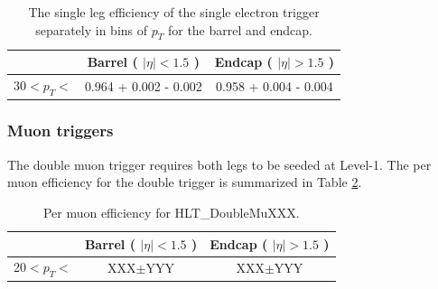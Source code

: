 \begin{table}[!ht]
\begin{center}
\begin{tabular}{c|c|c} \hline
              & Barrel ( $|\eta|<1.5$ )  & Endcap ( $|\eta|>1.5$ )  \\  \hline
\hline
30$<p_{T}<$   & 0.964 + 0.002 - 0.002 & 0.958 + 0.004 - 0.004 \\
\hline
\end{tabular}
\caption{The single leg efficiency of the single electron trigger 
separately in bins of $p_{T}$ for the barrel and endcap.
\label{tab:Ele27Efficiency}}
\end{center}
\end{table}

%
%
%
\subsubsection{Muon triggers}
The double muon trigger requires both legs to be seeded at Level-1.
The per muon efficiency for the double trigger is 
summarized in Table \ref{tab:eff_double_mu}. 


\begin{table}[!ht]
\begin{center}
\begin{tabular}{c|c|c} \hline
              & Barrel ( $|\eta|<1.5$ )  & Endcap ( $|\eta|>1.5$ )  \\  \hline
\hline
20$<p_{T}<$   & XXX$\pm$YYY & XXX$\pm$YYY \\
\hline
\end{tabular}
\caption{Per muon efficiency for HLT\_DoubleMuXXX.}
\label{tab:eff_double_mu}
\end{center}
\end{table}














